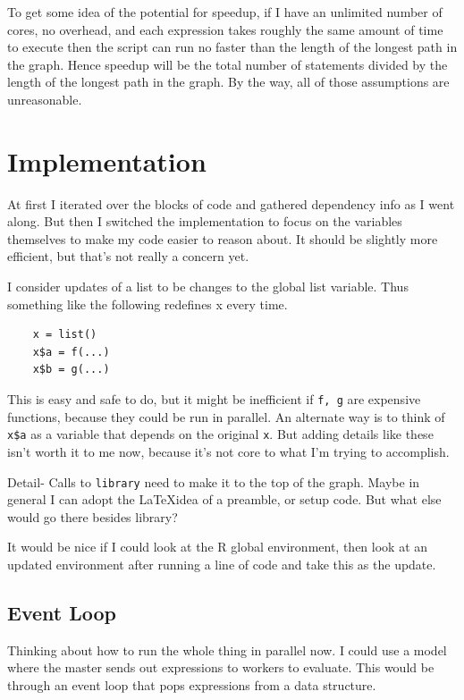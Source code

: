 \documentclass[12pt]{article}
\begin{document}
To get some idea of the potential for speedup, if I have an unlimited
number of cores, no overhead, and each expression takes roughly the same
amount of time to execute then the script can run no faster than the length
of the longest path in the graph. Hence speedup will be the total number
of statements divided by the length of the longest path in the graph.
By the way, all of those assumptions are unreasonable.



\section{Implementation}

At first I iterated over the blocks of code and gathered dependency info as
I went along. But then I switched the implementation to focus on the variables
themselves to make my code easier to reason about. It should be slightly
more efficient, but that's not really a concern yet.

I consider updates of a list to be changes to the global list variable.
Thus something like the following redefines x every time. 

\begin{verbatim}
    x = list()
    x$a = f(...)
    x$b = g(...)
\end{verbatim}
 
This is easy and safe to do, but it might be inefficient if \texttt{f, g}
are expensive functions, because they could be run in parallel. An
alternate way is to think of \texttt{x\$a} as a variable that depends on
the original \texttt{x}. But adding details like these isn't worth it to me
now, because it's not core to what I'm trying to accomplish.

Detail- Calls to \texttt{library} need to make it to the top of the graph. Maybe in
general I can adopt the \LaTeX idea of a preamble, or setup code. But what else would go
there besides library?

It would be nice if I could look at the R global environment, then
look at an updated environment after running a line of code and take this
as the update. 

\subsection{Event Loop}

Thinking about how to run the whole thing in parallel now. I could use a
model where the master sends out expressions to workers to
evaluate. This would be through an event loop that pops expressions from a data
structure.
\end{document}
